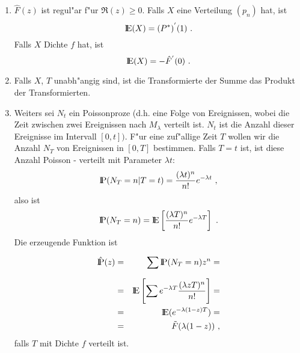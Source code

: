 \begin{appendix}
\begin{enumerate}
\item $ \hat F(z)$ ist regul"ar f"ur $ \Re (z) \geq 0$. Falls $X$ eine
Verteilung $(p_{n})$ hat, ist
\begin{displaymath}
{\rm I\kern-0.2em E}(X) = (P^{*})^{'}(1) ~.
\end{displaymath}  
Falls $X$ Dichte $f$ hat, ist
\begin{displaymath}
{\rm I\kern-0.2em E}(X) = -\hat F^{'}(0) ~.
\end{displaymath}  
\item Falls $X$, $T$ unabh"angig sind, ist die Transformierte der Summe
das Produkt der Transformierten.
\item Weiters sei $N_{t}$ ein Poissonproze\3 (d.h. eine Folge von
Ereignissen, wobei die Zeit zwischen zwei Ereignissen nach $M_{\lambda}$
verteilt ist. $N_{t}$ ist die Anzahl dieser Ereignisse im Intervall
$[0,t])$. F"ur eine zuf"allige Zeit $T$ wollen wir die Anzahl $N_{T}$ von
Ereignissen in $[0,T]$ bestimmen. Falls $T=t$ ist, ist diese Anzahl
Poisson - verteilt mit Parameter $\lambda t$:
\begin{displaymath}
{\rm I\kern-0.2em P} (N_{T} = n | T = t) = \frac{(\lambda t)^{n}}{n!} e^{- \lambda t} ~,
\end{displaymath}
also ist
\begin{displaymath}
{\rm I\kern-0.2em P} (N_{T} = n) = {\rm I\kern-0.2em E} \left[ \frac{( \lambda
T)^n}{n!} e^{- \lambda T} \right] ~.
\end{displaymath}
Die erzeugende Funktion ist
\begin{eqnarray*}
\hat {{\rm I\kern-0.2em P}}(z) &=&  \sum_{}^{} {\rm I\kern-0.2em P}(N_{T} = n) z^{n} = \\
&=& {\rm I\kern-0.2em E} \left[ \sum_{}^{} e^{-\lambda T} \frac{(\lambda z T)^{n}}{n!}
\right] = \\
&=& {\rm I\kern-0.2em E} (e^{- \lambda (1-z)T}) = \\
&=& \tilde F (\lambda(1-z)) ~,
\end{eqnarray*}
falls $T$ mit Dichte $f$ verteilt ist.
\end{enumerate}
\end{appendix}
